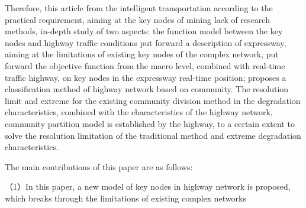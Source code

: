 \begin{eabstract}
	Therefore, this article from the intelligent transportation according to the practical requirement, aiming at the key nodes of mining lack of research methods, in-depth study of two aspects: the function model between the key nodes and highway traffic conditions put forward a description of expressway, aiming at the limitations of existing key nodes of the complex network, put forward the objective function from the macro level, combined with real-time traffic highway, on key nodes in the expressway real-time position; proposes a classification method of highway network based on community. The resolution limit and extreme for the existing community division method in the degradation characteristics, combined with the characteristics of the highway network, community partition model is established by the highway, to a certain extent to solve the resolution limitation of the traditional method and extreme degradation characteristics.
	
	The main contributions of this paper are as follows:
	
	（1）In this paper, a new model of key nodes in highway network is proposed, which breaks through the limitations of existing complex networks
	
\end{eabstract}

